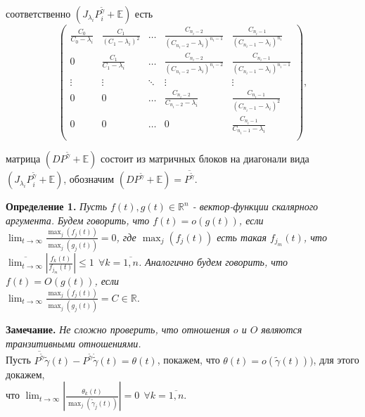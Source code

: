 \documentclass[12pt, a4paper]{article}
\begin{document}
соответственно $\left(J_{\lambda_i} P_i^{\widetilde{\gamma}} + \mathds{E}\right)$ есть
\[
\left(
\begin{array}{ccccc}
\displaystyle\frac{C_0}{C_0-\lambda_i} & \displaystyle\frac{C_1}{(C_1-\lambda_i)^2} & \dots & \displaystyle\frac{C_{n_i-2}}{(C_{n_i-2}-\lambda_i)^{n_i-1}} & \displaystyle\frac{C_{n_i-1}}{(C_{n_i-1}-\lambda_i)^{n_i}} \\
0 & \displaystyle\frac{C_1}{C_1-\lambda_i} & \dots & \displaystyle\frac{C_{n_i-2}}{(C_{n_i-2}-\lambda_i)^{n_i-2}} & \displaystyle\frac{C_{n_i-1}}{(C_{n_i-1}-\lambda_i)^{n_i-1}} \\
\vdots & \vdots & \ddots & \vdots & \vdots\\
0 & 0 & \dots & \displaystyle\frac{C_{n_i-2}}{C_{n_i-2}-\lambda_i} & \displaystyle\frac{C_{n_i-1}}{(C_{n_i-1}-\lambda_i)^2} \\
0 & 0 & \dots & 0 & \displaystyle\frac{C_{n_i-1}}{C_{n_i-1}-\lambda_i} \\
\end{array}
\right),
\]

матрица $\left(DP^{\widetilde{\gamma}} + \mathds{E}\right)$ состоит из матричных блоков на диагонали вида 
$\left(J_{\lambda_i} P_i^{\widetilde{\gamma}} + \mathds{E}\right)$, обозначим $\left(DP^{\widetilde{\gamma}} + \mathds{E}\right) = \overline{P^{\widetilde{\gamma}}}$. 

\quad \textbf{Определение 1.} \textit{Пусть $f(t), g(t) \in \mathds{R}^n$ - вектор-функции скалярного аргумента. Будем говорить, что $f(t) = o(g(t))$, если $\displaystyle\lim_{t \rightarrow \infty}\frac{\displaystyle\max_j(f_j(t))}{\displaystyle\max_j(g_j(t))} = 0$, где $\displaystyle\max_j(f_j(t))$ есть такая $f_{j_m}(t)$, что $\displaystyle \overline{\lim_{t \rightarrow \infty}}\left|\frac{f_k(t)}{f_{j_m}(t)}\right| \leq 1 \:\: \forall k=\overline{1, n}$. Аналогично будем говорить, что $f(t) = O(g(t))$, если \\ $\displaystyle\lim_{t \rightarrow \infty}\frac{\displaystyle\max_j(f_j(t))}{\displaystyle\max_j(g_j(t))} = C \in \mathds{R}$.}

\quad \textbf{Замечание.} \textit{Не сложно проверить, что отношения $o$ и $O$ являются транзитивными отношениями.}
\\

\quad Пусть $\overline{P^{\widetilde{\gamma}}}\widetilde{\gamma}(t) - P^{\widetilde{\gamma}}\dot{\widetilde{\gamma}}(t) = \theta(t)$, покажем, что $\theta(t) = o(\widetilde{\gamma}(t)))$, для этого докажем, \\ что $\displaystyle\lim_{t \rightarrow \infty}\left|\frac{\theta_k(t)}{\displaystyle\max_j(\widetilde{\gamma}_j(t))}\right| = 0  \:\: \forall k=\overline{1, n}$.
\end{document}
